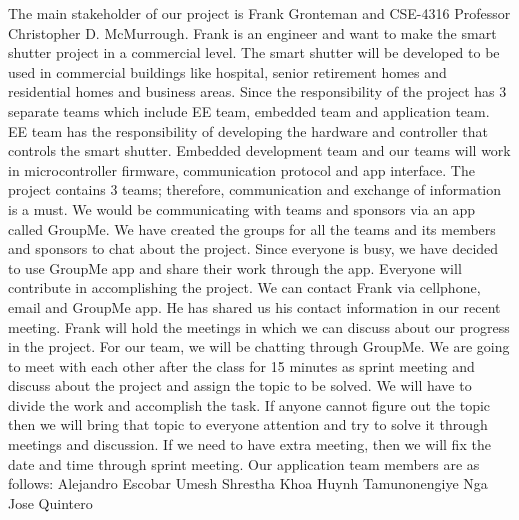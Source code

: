 The main stakeholder of our project is Frank Gronteman and CSE-4316 Professor Christopher D. McMurrough. Frank is an engineer and want to make the smart shutter project in a commercial level. The smart shutter will be developed to be used in commercial buildings like hospital, senior retirement homes and residential homes and business areas. \newline
Since the responsibility of the project has 3 separate teams which include EE team, embedded team and application team. EE team has the responsibility of developing the hardware and controller that controls the smart shutter. Embedded development team and our teams will work in microcontroller firmware, communication protocol and app interface. The project contains 3 teams; therefore, communication and exchange of information is a must. We would be communicating with teams and sponsors via an app called GroupMe. We have created the groups for all the teams and its members and sponsors to chat about the project. \newline
Since everyone is busy, we have decided to use GroupMe app and share their work through the app. Everyone will contribute in accomplishing the project. We can contact Frank via cellphone, email and GroupMe app. He has shared us his contact information in our recent meeting. Frank will hold the meetings in which we can discuss about our progress in the project. \newline
For our team, we will be chatting through GroupMe. We are going to meet with each other after the class for 15 minutes as sprint meeting and discuss about the project and assign the topic to be solved. We will have to divide the work and accomplish the task. If anyone cannot figure out the topic then we will bring that topic to everyone attention and try to solve it through meetings and discussion. If we need to have extra meeting, then we will fix the date and time through sprint meeting. \newline
Our application team members are as follows: 
Alejandro Escobar
Umesh Shrestha
Khoa Huynh
Tamunonengiye Nga
Jose Quintero
